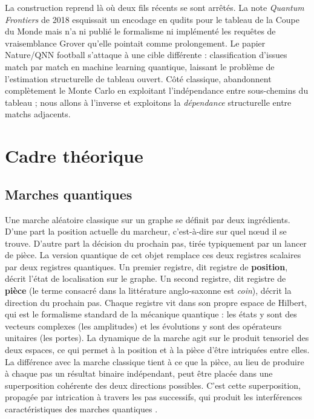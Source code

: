 \documentclass[11pt]{article}
\begin{document}
La construction reprend là où deux fils récents se sont arrêtés. La
note \emph{Quantum Frontiers} de 2018 \cite{quantumfrontiers_wc_2018}
esquissait un encodage en qudits pour le tableau de la Coupe du Monde
mais n'a ni publié le formalisme ni implémenté les requêtes de
vraisemblance Grover qu'elle pointait comme prolongement. Le papier
Nature/QNN football \cite{nature_qnn_football_2025} s'attaque à une
cible différente : classification d'issues match par match en machine
learning quantique, laissant le problème de l'estimation structurelle
de tableau ouvert. Côté classique, \cite{brandes2025stop} abandonnent
complètement le Monte Carlo en exploitant l'indépendance entre
sous-chemins du tableau ; nous allons à l'inverse et exploitons la
\emph{dépendance} structurelle entre matchs adjacents.

\section{Cadre théorique}
\label{sec:bg}

\subsection{Marches quantiques}

Une marche aléatoire classique sur un graphe se définit par deux
ingrédients. D'une part la position actuelle du marcheur,
c'est-à-dire sur quel nœud il se trouve. D'autre part la décision du
prochain pas, tirée typiquement par un lancer de pièce. La version
quantique de cet objet remplace ces deux registres scalaires par deux
registres quantiques. Un premier registre, dit registre de
\textbf{position}, décrit l'état de localisation sur le graphe. Un
second registre, dit registre de \textbf{pièce} (le terme consacré
dans la littérature anglo-saxonne est \emph{coin}), décrit la
direction du prochain pas. Chaque registre vit dans son propre espace
de Hilbert, qui est le formalisme standard de la mécanique quantique :
les états y sont des vecteurs complexes (les amplitudes) et les
évolutions y sont des opérateurs unitaires (les portes). La dynamique
de la marche agit sur le produit tensoriel des deux espaces, ce qui
permet à la position et à la pièce d'être intriquées entre elles. La
différence avec la marche classique tient à ce que la pièce, au lieu
de produire à chaque pas un résultat binaire indépendant, peut être
placée dans une superposition cohérente des deux directions
possibles. C'est cette superposition, propagée par intrication à
travers les pas successifs, qui produit les interférences
caractéristiques des marches quantiques
\cite{aharonov1993quantum, kempe2003quantum, portugal2018quantum}.
\end{document}
